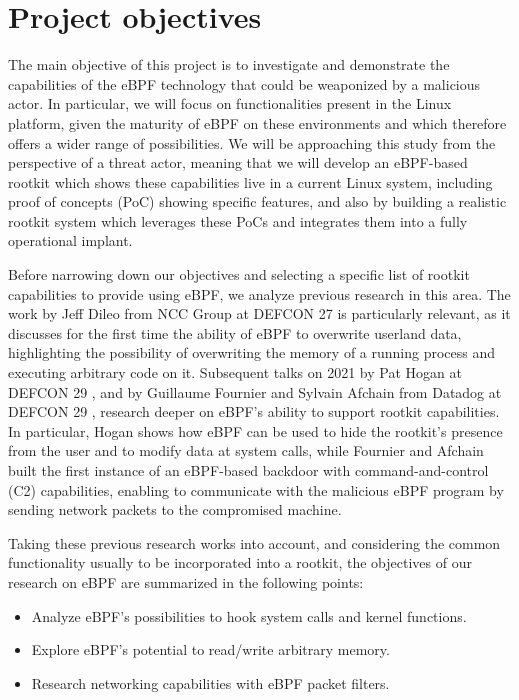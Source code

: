 \section{Project objectives} \label{section:project_objectives}
The main objective of this project is to investigate and demonstrate the capabilities of
the eBPF technology that could be weaponized by a malicious actor. In
particular, we will focus on functionalities present in the Linux platform,
given the maturity of eBPF on these environments and which therefore offers
a wider range of possibilities. We will be approaching this study from the
perspective of a threat actor, meaning that we will develop an eBPF-based
rootkit which shows these capabilities live in a current Linux system,
including proof of concepts (PoC) showing specific features, and also by
building a realistic rootkit system which leverages these PoCs and
integrates them into a fully operational implant.

Before narrowing down our objectives and selecting a specific list of
rootkit capabilities to provide using eBPF, we analyze previous research in
this area. The work by Jeff Dileo from NCC Group at DEFCON 27
\cite{evil_ebpf} is particularly relevant, as it discusses for the first
time the ability of eBPF to overwrite userland data, highlighting the
possibility of overwriting the memory of a running process and executing
arbitrary code on it.
%
Subsequent talks on 2021 by Pat Hogan at DEFCON 29 \cite{bad_ebpf}, and by
Guillaume Fournier and Sylvain Afchain from Datadog at DEFCON 29
\cite{ebpf_friends}, research deeper on eBPF's ability to support rootkit
capabilities. In particular, Hogan shows how eBPF can be used to hide the
rootkit's presence from the user and to modify data at system calls, while
Fournier and Afchain built the first instance of an eBPF-based backdoor
with command-and-control (C2) capabilities, enabling to communicate with
the malicious eBPF program by sending network packets to the compromised
machine.

Taking these previous research works into account, and considering the
common functionality usually to be incorporated into a rootkit, the
objectives of our research on eBPF are summarized in the following points:
\begin{itemize}
\item Analyze eBPF's possibilities to hook system calls and kernel
functions.
\item Explore eBPF's potential to read/write arbitrary memory.
\item Research networking capabilities with eBPF packet filters.
\end{itemize}

